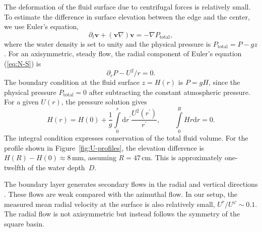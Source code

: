 \documentclass[aps,twocolumn]{revtex4-2}
\begin{document}
The deformation of the fluid surface due to centrifugal forces is relatively small. To estimate the difference in surface elevation between the edge and the center, we use Euler's equation,
\begin{equation}\label{eq:N-S}
	\partial_t {\bm v} + ({\bm v}\nabla){\bm v} = - \nabla P_{\mathrm{total}},
\end{equation}
where the water density is set to unity and the physical pressure is $P_{\mathrm{total}} = P - gz$. For an axisymmetric, steady flow, the radial component of Euler's equation (\ref{eq:N-S}) is
\begin{equation}
	\partial_r P - U^2/r = 0.
\end{equation}
The boundary condition at the fluid surface $z=H(r)$ is $P = gH$, since the physical pressure $P_{\mathrm{total}} = 0$ after subtracting the constant atmospheric pressure. For a given $U(r)$, the pressure solution gives
\begin{equation}
	H(r) = H(0)
	+ \frac{1}{g}\int\limits_0^r \mathrm{d}r^\prime \frac{U^2(r^\prime)}{r^\prime},
	\qquad
	\int\limits_0^R Hr\mathrm{d}r = 0.
\end{equation}
The integral condition expresses conservation of the total fluid volume. For the profile shown in Figure~\ref{fig:U-profiles}, the elevation difference is $H(R) - H(0) \approx 8\,\text{mm}$, assuming $R=47\,\text{cm}$. This is approximately one-twelfth of the water depth~$D$.

The boundary layer generates secondary flows in the radial and vertical directions \cite{yang2019axisymmetric}. These flows are weak compared with the azimuthal flow. In our setup, the measured mean radial velocity at the surface is also relatively small, $U^r/U^\varphi\sim 0.1$. The radial flow is not axisymmetric but instead follows the symmetry of the square basin.
\end{document}
